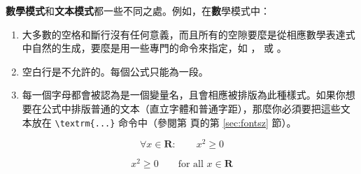 \textbf{數學模式}和\textbf{文本模式}都一些不同之處。例如，在{\textbf
數學模式}中：
\begin{enumerate}

%
%


\item 大多數的空格和斷行沒有任何意義，而且所有的空隙要麼是從相應數學表達式中自然的生成，要麼是用一些專門的命令來指定，如 \ci{,}，   或 。
\item 空白行是不允許的。每個公式只能為一段。
\item 每一個字母都會被認為是一個變量名，且會相應被排版為此種樣式。如果你想要在公式中排版普通的文本（直立字體和普通字距），那麼你必須要把這些文本放在 \verb|\textrm{...}| 命令中（參閱第 \pageref{sec:fontsz} 頁的第 \ref{sec:fontsz} 節）。
\end{enumerate}



\begin{example}
\begin{equation}
\forall x \in \mathbf{R}:
\qquad x^{2} \geq 0
\end{equation}
\end{example}
\begin{example}
\begin{equation}
x^{2} \geq 0\qquad
\textrm{for all }x\in\mathbf{R}
\end{equation}
\end{example}


%
%

